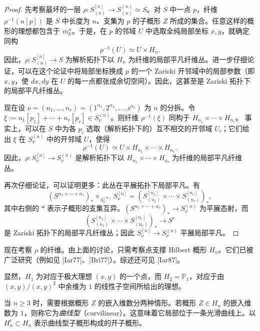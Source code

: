 \begin{proof}
先考察最坏的一层 $\rho:S_{(n)}^{[n]}\to S_{(n)}^{(n)}\simeq S$。对 $S$ 中一点 $p$，纤维 $\rho^{-1}(n[p])$ 是 $S$ 中长度为 $n$、支集为 $p$ 的子概形 $Z$ 所成的集合。任意这样的概形的理想都包含于 $m_p^n$。于是，在 $p$ 的邻域 $U$ 中选取全纯局部坐标 $x,y$，就确定同构
\[
\rho^{-1}(U)\simeq U\times H_n.
\]
因此，$\rho:S_{(n)}^{[n]}\to S$ 为解析拓扑下以 $H_n$ 为纤维的局部平凡纤维丛。进一步仔细论证，可以在这个论证中将局部坐标换成 $p$ 的一个 Zariski 开邻域中的局部参数（即 $x,y$，使 $dx,dy$ 在 $U$ 的每一点都张成余切空间）。因此，这甚至是 Zariski 拓扑下的局部平凡纤维丛。

现在设 $\nu=(n_1,\ldots,n_r)=(1^{\alpha_1},2^{\alpha_2},\ldots,s^{\alpha_s})$ 为 $n$ 的分拆。令 $\xi:=n_1[p_1]+\cdots+n_r[p_r]\in S_\nu^{(n)}$。则纤维 $\rho^{-1}(\xi)$ 同构于 $H_{n_1}\times\cdots\times H_{n_r}$。
事实上，可以在 $S$ 中为各 $p_i$ 选取（解析拓扑下的）互不相交的开邻域 $U_i$；它们给出 $\xi$ 在 $S_\nu^{(n)}$ 中的开邻域 $U$，使得
\[
\rho^{-1}(U)\simeq U\times H_{n_1}\times\cdots\times H_{n_r}.
\]
因此，$\rho:S_\nu^{[n]}\to S_\nu^{(n)}$ 是解析拓扑下以 $H_{n_1}\times\cdots\times H_{n_r}$ 为纤维的局部平凡纤维丛。

再次仔细论证，可以证明更多：此丛在平展拓扑下局部平凡。有
\[
(S^{\alpha_1+\cdots+\alpha_s})_*\times_{S_\nu^{(n)}}S_\nu^{[n]}
=\left(S_{(n_1)}^{[n_1]}\times\cdots\times S_{(n_r)}^{[n_r]}\right)_*,
\]
其中右侧的 $*$ 表示子概形的支集互异。$(S^{\alpha_1+\cdots+\alpha_s})_*\to S_\nu^{(n)}$ 为平展态射，而
\[
\left(S_{(n_1)}^{[n_1]}\times\cdots\times S_{(n_r)}^{[n_r]}\right)_*\longrightarrow S^r
\]
是 Zariski 拓扑下的局部平凡纤维丛；因此 $S_\nu^{[n]}\to S_\nu^{(n)}$ 平展局部平凡。
\end{proof}
现在考察 $\rho$ 的纤维。由上面的讨论，只需考察点支撑 Hilbert 概形 $H_n$。它们已被广泛研究（例如见 [Iar77]、[Bri77]）。综述还可见 [Iar87]。

显然，$H_1$ 为对应于极大理想 $(x,y)$ 的一个点，而 $H_2=\mathbb P_1$，对应于由 $(x,y)/(x,y)^2$ 中余维为 $1$ 的线性子空间所给出的理想。

当 $n\geq3$ 时，需要根据概形 $Z$ 的嵌入维数分两种情形。若概形 $Z\in H_n$ 的嵌入维数为 $1$，则称它为\emph{曲线型}（curvilinear）。这意味着它局部位于一条光滑曲线上。以 $H_n^c\subset H_n$ 表示曲线型子概形构成的开子概形。

